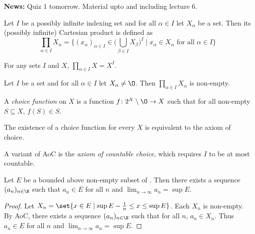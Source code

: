 
\textbf{News:} Quiz 1 tomorrow.
Material upto and including lecture 6.

\begin{definition}
    Let $I$ be a possibly infinite indexing set and for all $\alpha \in I$
    let $X_\alpha$ be a set.
    Then its (possibly infinite) Cartesian product is defined as
    \[
        \prod_{\alpha \in I} X_\alpha = \bigg\{
            (x_\alpha)_{\alpha \in I} \in \Big(\bigcup_{\beta \in I}
            X_\beta\Big)^I \;\bigg\vert\; x_\alpha \in X_\alpha
            \text{ for all } \alpha \in I
        \bigg\}
    \]
\end{definition}

\begin{exercise}
    For any sets $I$ and $X$, $\prod_{\alpha \in I} X = X^I$.
\end{exercise}
\begin{axiom}[Choice] \label{def:zfc:choice}
    Let $I$ be a set and for all $\alpha \in I$ let $X_\alpha \ne \O$.
    Then $\prod_{\alpha \in I} X_\alpha$ is non-empty.
\end{axiom}

\begin{definition}
    A \emph{choice function} on $X$ is a function $f\colon 2^X \setminus \O
    \to X$ such that for all non-empty $S \subseteq X$, $f(S) \in S$.
\end{definition}
\begin{fact}
    The existence of a choice function for every $X$ is equivalent to the
    axiom of choice.
\end{fact}
\begin{remark}
    A variant of AoC is the \emph{axiom of countable choice}, which requires
    $I$ to be at most countable.
\end{remark}

\begin{lemma}
    Let $E$ be a bounded above non-empty subset of \R.
    Then there exists a sequence $(a_n)_{n \in \N}$ such that $a_n \in E$ for
    all $n$ and $\lim_{n \to \infty} a_n = \sup E$.
\end{lemma}
\begin{proof}
    Let $X_n = \set{x \in E \mid \sup E - \frac1n \le x \le \sup E}$.
    Each $X_n$ is non-empty.
    By AoC, there exists a sequence $(a_n)_{n \in \N}$ such that for all
    $n$, $a_n \in X_n$.
    Thus $a_n \in E$ for all $n$ and $\lim_{n \to \infty} a_n = \sup E$.
\end{proof}

